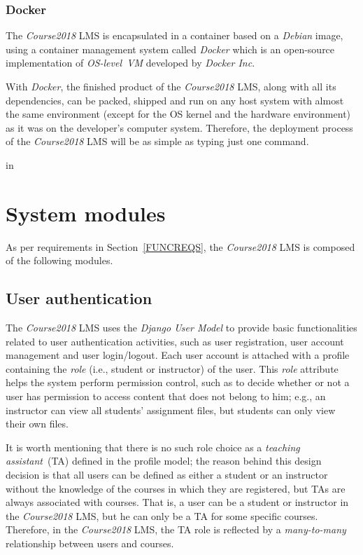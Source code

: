 \subsubsection{Docker}
The \emph{Course2018} LMS is encapsulated in a container based on a
\emph{Debian} image, using a container management system called \emph{Docker}
which is an open-source implementation of \emph{OS-level~VM} developed by
\emph{Docker Inc}.

\medskip

With \emph{Docker}, the finished product of the
\emph{Course2018} LMS, along with all its dependencies, can be packed, shipped
and run on any host system with almost the same environment
(except for the OS kernel and the hardware environment)
as it was on the
developer's computer system. Therefore, the deployment process of the
\emph{Course2018} LMS will be as simple as typing just one command.

 in


\section{System modules}

As per requirements in Section~\ref{FUNCREQS}, the \emph{Course2018} LMS is composed of the
following modules.

\subsection{User authentication}
\label{sec:USRAUTH}
The \emph{Course2018} LMS uses the \emph{Django User Model} \cite{djangoUser}
to provide
basic functionalities related to user authentication activities, such as
user registration, user account management and user login/logout.
Each user account is attached with a profile containing the \emph{role}
(i.e., student or instructor) of the user. This \emph{role} attribute helps
the system perform permission control, such as to
decide whether or not a user has permission to access content
that does not belong to him; e.g., an instructor can view all students' assignment
files, but students can only view their own files.

\medskip

It is worth mentioning that there is no such role choice as a \emph{teaching
assistant}~(TA) defined in the profile model;
the reason behind this design decision is that all users can be defined as either a
student or an instructor without the knowledge of the courses in which they are
registered, but TAs are always associated with courses. That is, a user
can be a student or instructor in the \emph{Course2018} LMS, but he can only
be a TA for some specific courses.
Therefore, in the \emph{Course2018} LMS, the TA role is
reflected by a \emph{many-to-many} relationship between users and courses.

